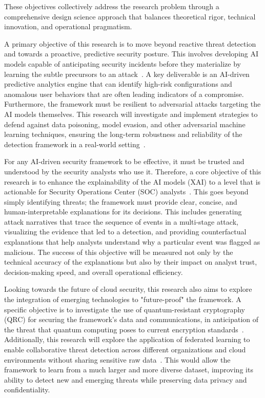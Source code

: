 These objectives collectively address the research problem through a comprehensive design science approach that balances theoretical rigor, technical innovation, and operational pragmatism.

A primary objective of this research is to move beyond reactive threat detection and towards a proactive, predictive security posture. This involves developing AI models capable of anticipating security incidents before they materialize by learning the subtle precursors to an attack~\cite{viderity2024proactive}. A key deliverable is an AI-driven predictive analytics engine that can identify high-risk configurations and anomalous user behaviors that are often leading indicators of a compromise. Furthermore, the framework must be resilient to adversarial attacks targeting the AI models themselves. This research will investigate and implement strategies to defend against data poisoning, model evasion, and other adversarial machine learning techniques, ensuring the long-term robustness and reliability of the detection framework in a real-world setting~\cite{sada2024adversarial}.

For any AI-driven security framework to be effective, it must be trusted and understood by the security analysts who use it. Therefore, a core objective of this research is to enhance the explainability of the AI models (XAI) to a level that is actionable for Security Operations Center (SOC) analysts~\cite{kpmg2024xai}. This goes beyond simply identifying threats; the framework must provide clear, concise, and human-interpretable explanations for its decisions. This includes generating attack narratives that trace the sequence of events in a multi-stage attack, visualizing the evidence that led to a detection, and providing counterfactual explanations that help analysts understand why a particular event was flagged as malicious. The success of this objective will be measured not only by the technical accuracy of the explanations but also by their impact on analyst trust, decision-making speed, and overall operational efficiency.

Looking towards the future of cloud security, this research also aims to explore the integration of emerging technologies to "future-proof" the framework. A specific objective is to investigate the use of quantum-resistant cryptography (QRC) for securing the framework's data and communications, in anticipation of the threat that quantum computing poses to current encryption standards~\cite{osf2024quantum}. Additionally, this research will explore the application of federated learning to enable collaborative threat detection across different organizations and cloud environments without sharing sensitive raw data~\cite{researchgate2024federated}. This would allow the framework to learn from a much larger and more diverse dataset, improving its ability to detect new and emerging threats while preserving data privacy and confidentiality.


